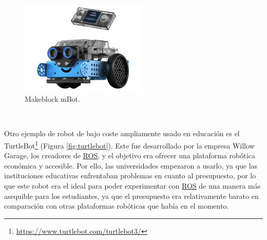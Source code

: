 \begin{figure} [H]
  \begin{center}
    \includegraphics[width=6cm]{figs/mbot-2.jpg}
  \end{center}
  \caption{Makeblock mBot.}
  \label{fig:mbot-2}
\end{figure}\


Otro ejemplo de robot de bajo coste ampliamente usado en educación es el TurtleBot\footnote{\url{https://www.turtlebot.com/turtlebot3/}} (Figura \ref{fig:turtlebot}). Este fue desarrollado por la empresa Willow Garage, los creadores de \hyperlink{ROS}{ROS}, y el objetivo era ofrecer una plataforma robótica económica y accesible. Por ello, las universidades empezaron a usarlo, ya que las instituciones educativas enfrentaban problemas en cuanto al presupuesto, por lo que este robot era el ideal para poder experimentar con \hyperlink{ROS}{ROS} de una manera más asequible para los estudiantes, ya que el presupuesto era relativamente barato en comparación con otras plataformas robóticas que había en el momento.

